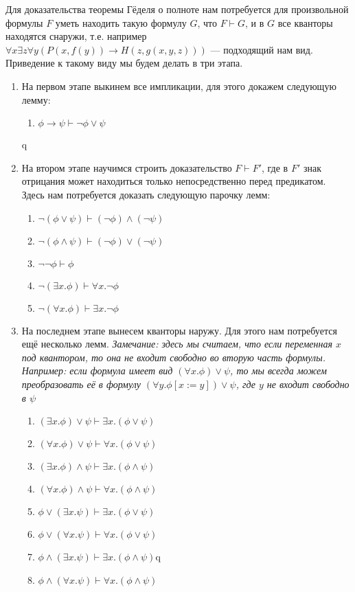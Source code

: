 \documentclass[10pt,a4paper,oneside]{article}
\begin{document}
Для доказательства теоремы Гёделя о полноте нам потребуется для произвольной формулы $F$ уметь находить такую формулу $G$, что  $F \vdash G$, и в $G$ все кванторы находятся снаружи, т.е. например $\forall x\exists z\forall y (P(x, f(y)) \rightarrow H(z, g(x, y, z)))$ --- подходящий нам вид. Приведение к такому виду мы будем делать в три этапа.
\begin{enumerate}
	\item На первом этапе выкинем все импликации, для этого докажем следующую лемму:
    \begin {enumerate}
		\item $\phi \rightarrow \psi \vdash \neg \phi \vee \psi$
    \end{enumerate}
q
    \item На втором этапе научимся строить доказательство $F \vdash F'$, где в $F'$ знак отрицания может находиться только непосредственно перед предикатом. Здесь нам потребуется доказать следующую парочку лемм:
  \begin{enumerate}
      \item $\neg(\phi \vee \psi) \vdash (\neg \phi) \wedge (\neg \psi)$
      \item $\neg(\phi \wedge \psi) \vdash (\neg \phi) \vee (\neg \psi)$
      \item $\neg\neg \phi \vdash \phi$
      \item $\neg(\exists x.\phi) \vdash \forall x.\neg\phi$
      \item $\neg(\forall x.\phi) \vdash \exists x.\neg\phi$
  \end{enumerate}

  \item На последнем этапе вынесем кванторы наружу. Для этого нам потребуется ещё несколько лемм.
  \textit{Замечание: здесь мы считаем, что если переменная $x$ под квантором, то она не входит свободно во вторую часть формулы. Например: если формула имеет вид $(\forall x.\phi) \vee \psi$, то мы всегда можем преобразовать её в формулу $(\forall y.\phi[x:=y]) \vee \psi$, где $y$ не входит свободно в $\psi$}
  \begin{enumerate}
      \item $(\exists x.\phi) \vee \psi \vdash \exists x.(\phi \vee \psi)$
      \item $(\forall x.\phi) \vee \psi \vdash \forall x.(\phi \vee \psi)$
      \item $(\exists x.\phi) \wedge \psi \vdash \exists x.(\phi \wedge \psi)$
      \item $(\forall x.\phi) \wedge \psi \vdash \forall x.(\phi \wedge \psi)$

      \item $\phi \vee (\exists x.\psi) \vdash \exists x.(\phi \vee \psi)$
      \item $\phi \vee (\forall x.\psi) \vdash \forall x.(\phi \vee \psi)$
      \item $\phi \wedge (\exists x.\psi) \vdash \exists x.(\phi \wedge \psi)$q
      \item $\phi \wedge (\forall x.\psi) \vdash \forall x.(\phi \wedge \psi)$
  \end{enumerate}


\end{enumerate}
\end{document}
